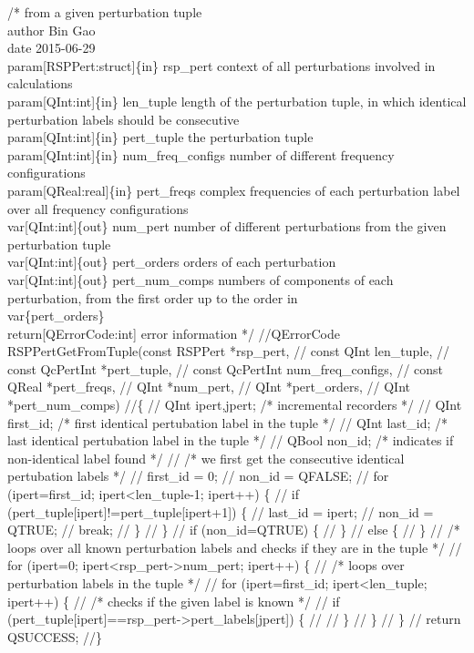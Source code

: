 /*%
        from a given perturbation tuple
    \\author Bin Gao
    \\date 2015-06-29
    \\param[RSPPert:struct]\{in\} rsp_pert context of all perturbations involved
        in calculations
    \\param[QInt:int]\{in\} len_tuple length of the perturbation tuple, in which
        identical perturbation labels should be consecutive
    \\param[QInt:int]\{in\} pert_tuple the perturbation tuple
    \\param[QInt:int]\{in\} num_freq_configs number of different frequency configurations
    \\param[QReal:real]\{in\} pert_freqs complex frequencies of each perturbation label
        over all frequency configurations
    \\var[QInt:int]\{out\} num_pert number of different perturbations from the given
        perturbation tuple
    \\var[QInt:int]\{out\} pert_orders orders of each perturbation
    \\var[QInt:int]\{out\} pert_num_comps numbers of components of each perturbation,
        from the first order up to the order in \\var\{pert_orders\}
    \\return[QErrorCode:int] error information
*/
//QErrorCode RSPPertGetFromTuple(const RSPPert *rsp_pert,
//                               const QInt len_tuple,
//                               const QcPertInt *pert_tuple,
//                               const QcPertInt num_freq_configs,
//                               const QReal *pert_freqs,
//                               QInt *num_pert,
//                               QInt *pert_orders,
//                               QInt *pert_num_comps)
//\{
//    QInt ipert,jpert;  /* incremental recorders */
//    QInt first_id;     /* first identical pertubation label in the tuple */
//    QInt last_id;      /* last identical pertubation label in the tuple */
//    QBool non_id;      /* indicates if non-identical label found */
//    /* we first get the consecutive identical pertubation labels */
//    first_id = 0;
//    non_id = QFALSE;
//    for (ipert=first_id; ipert<len_tuple-1; ipert++) \{
//        if (pert_tuple[ipert]!=pert_tuple[ipert+1]) \{
//            last_id = ipert;
//            non_id = QTRUE;
//            break;
//        \}
//    \}
//    if (non_id=QTRUE) \{
//    \}
//    else \{
//    \}
//    /* loops over all known perturbation labels and checks if they are in the tuple */
//    for (ipert=0; ipert<rsp_pert->num_pert; ipert++) \{
//        /* loops over perturbation labels in the tuple */
//        for (ipert=first_id; ipert<len_tuple; ipert++) \{
//            /* checks if the given label is known */
//            if (pert_tuple[ipert]==rsp_pert->pert_labels[jpert]) \{
//                
//            \}
//        \}
//    \}
//    return QSUCCESS;
//\}


